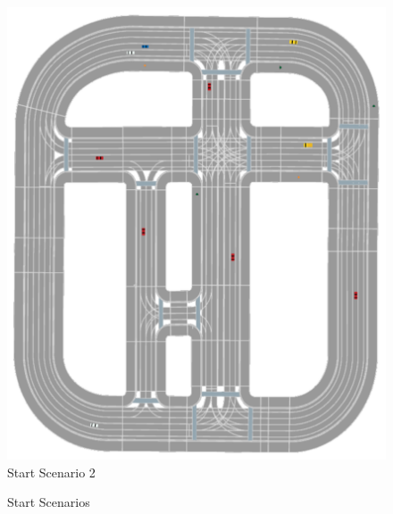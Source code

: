 \begin{figure}[ht]
\begin{minipage}[b]{0.5\linewidth}
		\includegraphics[width=1\linewidth]{figures/start_scenarios/scenario_2} 
		Start Scenario 2
	\end{minipage} 
	\caption{Start Scenarios}
	\label{fig:appendix:start_scenarios_1_2} 
\end{figure}

